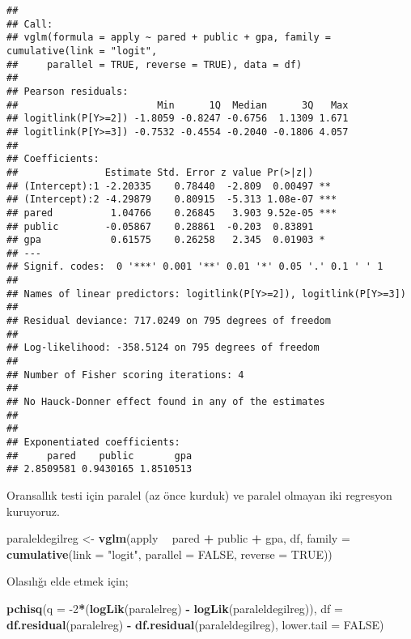 \documentclass[
]{book}
\newenvironment{Shaded}{\begin{snugshade}}{\end{snugshade}}
\newcommand{\DataTypeTok}[1]{\textcolor[rgb]{0.13,0.29,0.53}{#1}}
\newcommand{\DecValTok}[1]{\textcolor[rgb]{0.00,0.00,0.81}{#1}}
\newcommand{\KeywordTok}[1]{\textcolor[rgb]{0.13,0.29,0.53}{\textbf{#1}}}
\newcommand{\NormalTok}[1]{#1}
\newcommand{\OperatorTok}[1]{\textcolor[rgb]{0.81,0.36,0.00}{\textbf{#1}}}
\newcommand{\OtherTok}[1]{\textcolor[rgb]{0.56,0.35,0.01}{#1}}
\newcommand{\StringTok}[1]{\textcolor[rgb]{0.31,0.60,0.02}{#1}}
\begin{document}
\begin{verbatim}
## 
## Call:
## vglm(formula = apply ~ pared + public + gpa, family = cumulative(link = "logit", 
##     parallel = TRUE, reverse = TRUE), data = df)
## 
## Pearson residuals:
##                        Min      1Q  Median      3Q   Max
## logitlink(P[Y>=2]) -1.8059 -0.8247 -0.6756  1.1309 1.671
## logitlink(P[Y>=3]) -0.7532 -0.4554 -0.2040 -0.1806 4.057
## 
## Coefficients: 
##               Estimate Std. Error z value Pr(>|z|)    
## (Intercept):1 -2.20335    0.78440  -2.809  0.00497 ** 
## (Intercept):2 -4.29879    0.80915  -5.313 1.08e-07 ***
## pared          1.04766    0.26845   3.903 9.52e-05 ***
## public        -0.05867    0.28861  -0.203  0.83891    
## gpa            0.61575    0.26258   2.345  0.01903 *  
## ---
## Signif. codes:  0 '***' 0.001 '**' 0.01 '*' 0.05 '.' 0.1 ' ' 1
## 
## Names of linear predictors: logitlink(P[Y>=2]), logitlink(P[Y>=3])
## 
## Residual deviance: 717.0249 on 795 degrees of freedom
## 
## Log-likelihood: -358.5124 on 795 degrees of freedom
## 
## Number of Fisher scoring iterations: 4 
## 
## No Hauck-Donner effect found in any of the estimates
## 
## 
## Exponentiated coefficients:
##     pared    public       gpa 
## 2.8509581 0.9430165 1.8510513
\end{verbatim}

Oransallık testi için paralel (az önce kurduk) ve paralel olmayan iki regresyon kuruyoruz.

\begin{Shaded}
\begin{Highlighting}[]
\NormalTok{paraleldegilreg <-}\StringTok{ }\KeywordTok{vglm}\NormalTok{(apply }\OperatorTok{~}\StringTok{ }\NormalTok{pared }\OperatorTok{+}\StringTok{ }\NormalTok{public }\OperatorTok{+}\StringTok{ }\NormalTok{gpa, df, }\DataTypeTok{family =} \KeywordTok{cumulative}\NormalTok{(}\DataTypeTok{link =} \StringTok{"logit"}\NormalTok{, }\DataTypeTok{parallel =} \OtherTok{FALSE}\NormalTok{, }\DataTypeTok{reverse =} \OtherTok{TRUE}\NormalTok{))}
\end{Highlighting}
\end{Shaded}

Olasılığı elde etmek için;

\begin{Shaded}
\begin{Highlighting}[]
\KeywordTok{pchisq}\NormalTok{(}\DataTypeTok{q =} \DecValTok{-2}\OperatorTok{*}\NormalTok{(}\KeywordTok{logLik}\NormalTok{(paralelreg) }\OperatorTok{-}\StringTok{ }\KeywordTok{logLik}\NormalTok{(paraleldegilreg)),}
       \DataTypeTok{df =} \KeywordTok{df.residual}\NormalTok{(paralelreg) }\OperatorTok{-}\StringTok{ }\KeywordTok{df.residual}\NormalTok{(paraleldegilreg),}
       \DataTypeTok{lower.tail =} \OtherTok{FALSE}\NormalTok{)}
\end{Highlighting}
\end{Shaded}
\end{document}
